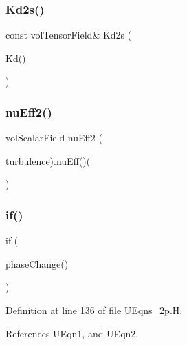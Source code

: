 \subsubsection{\texorpdfstring{Kd2s()}{Kd2s()}}
{\footnotesize\ttfamily const vol\+Tensor\+Field\& Kd2s (\begin{DoxyParamCaption}\item[{F2\+S\+Pair\+\_\+.}]{Kd() }\end{DoxyParamCaption})}

\mbox{\label{UEqns__2p_8H_af0c0b1dc192a2846ed0d497c6b4b56a7}} 
\subsubsection{\texorpdfstring{nu\+Eff2()}{nuEff2()}}
{\footnotesize\ttfamily vol\+Scalar\+Field nu\+Eff2 (\begin{DoxyParamCaption}\item[{fluid2\+\_\+.}]{turbulence).\+nu\+Eff()( }\end{DoxyParamCaption})}

\mbox{\label{UEqns__2p_8H_a97ae903740550c29a2c4daa299c86967}} 
\subsubsection{\texorpdfstring{if()}{if()}\hspace{0.1cm}{\footnotesize\ttfamily [1/3]}}
{\footnotesize\ttfamily if (\begin{DoxyParamCaption}\item[{F\+F\+Pair\+\_\+.}]{phase\+Change() }\end{DoxyParamCaption})}



Definition at line 136 of file U\+Eqns\+\_\+2p.\+H.



References U\+Eqn1, and U\+Eqn2.

\mbox{\label{UEqns__2p_8H_a5d47249e0353755ef05fa72ce53ed5b7}} 
